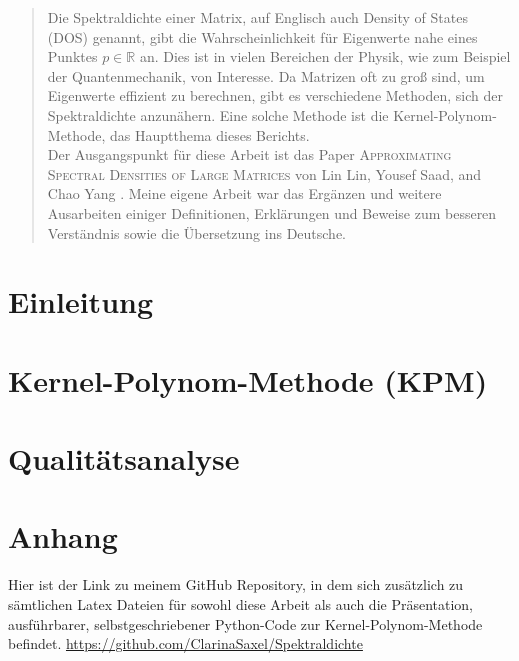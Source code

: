 \documentclass[a4paper,12pt]{report}
\theoremstyle{mydefinition}
\newcommand{\1}{\mathds{1}}
\newcommand{\R}{\mathbb{R}}
\begin{document}


\newpage

\begin{abstract}
Die Spektraldichte einer Matrix,
auf Englisch auch Density of States (DOS) genannt,
gibt die Wahrscheinlichkeit für Eigenwerte nahe eines Punktes $p \in \R$ an.
Dies ist in vielen Bereichen der Physik, wie zum Beispiel der Quantenmechanik, von Interesse. 
Da Matrizen oft zu groß sind, um Eigenwerte effizient zu berechnen, gibt es verschiedene Methoden, sich der Spektraldichte anzunähern.
Eine solche Methode ist die Kernel-Polynom-Methode, das Hauptthema dieses Berichts.\\
Der Ausgangspunkt für diese Arbeit ist das Paper \textsc{Approximating Spectral Densities of Large Matrices} von Lin Lin, Yousef Saad, and Chao Yang \cite{linsaadyang14}.
Meine eigene Arbeit war das Ergänzen und weitere Ausarbeiten einiger Definitionen, Erklärungen und Beweise zum besseren Verständnis sowie die Übersetzung ins Deutsche.
\end{abstract}

\newpage

\tableofcontents

\newpage

\chapter{Einleitung}


\chapter{Kernel-Polynom-Methode (KPM)}


\chapter{Qualitätsanalyse}

\newpage

\chapter{Anhang}
Hier ist der Link zu meinem GitHub Repository,
in dem sich zusätzlich zu sämtlichen Latex Dateien für sowohl diese Arbeit als auch die Präsentation,
ausführbarer, selbstgeschriebener Python-Code zur Kernel-Polynom-Methode befindet.
\url{https://github.com/ClarinaSaxel/Spektraldichte}


\end{document}

